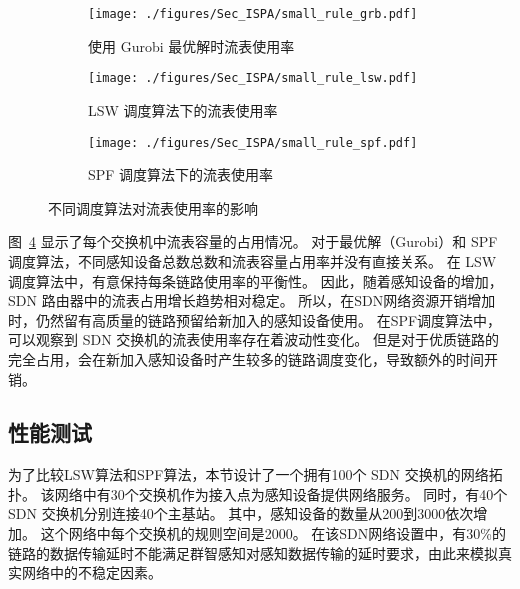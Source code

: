 
\begin{figure}[!h]
  \centering
  \begin{subfigure}[h]{0.99\linewidth}
  \centering

    \texttt{[image: ./figures/Sec\_ISPA/small\_rule\_grb.pdf]}
    \label{fig_smallNetworkRG}
    \caption{使用 Gurobi 最优解时流表使用率}
  \end{subfigure}
  \begin{subfigure}[h]{0.99\linewidth}
    \texttt{[image: ./figures/Sec\_ISPA/small\_rule\_lsw.pdf]}
    \label{fig_smallNetworkRL}
    \caption{LSW 调度算法下的流表使用率}
  \end{subfigure}
  \begin{subfigure}[h]{0.99\linewidth}
    \texttt{[image: ./figures/Sec\_ISPA/small\_rule\_spf.pdf]}
    \label{fig_smallNetworkRS}
    \caption{SPF 调度算法下的流表使用率}
  \end{subfigure}
  \vspace{-1em}
  \caption{不同调度算法对流表使用率的影响}
\label{fig_smallrule}
\end{figure}

图~\ref{fig_smallrule} 显示了每个交换机中流表容量的占用情况。
对于最优解（Gurobi）和 SPF 调度算法，不同感知设备总数总数和流表容量占用率并没有直接关系。
在 LSW 调度算法中，有意保持每条链路使用率的平衡性。
因此，随着感知设备的增加，SDN 路由器中的流表占用增长趋势相对稳定。
所以，在SDN网络资源开销增加时，仍然留有高质量的链路预留给新加入的感知设备使用。
在SPF调度算法中，可以观察到 SDN 交换机的流表使用率存在着波动性变化。
但是对于优质链路的完全占用，会在新加入感知设备时产生较多的链路调度变化，导致额外的时间开销。



\subsection{性能测试}

为了比较LSW算法和SPF算法，本节设计了一个拥有100个 SDN 交换机的网络拓扑。
该网络中有30个交换机作为接入点为感知设备提供网络服务。
同时，有40个 SDN 交换机分别连接40个主基站。
其中，感知设备的数量从200到3000依次增加。
这个网络中每个交换机的规则空间是2000。
在该SDN网络设置中，有30\%的链路的数据传输延时不能满足群智感知对感知数据传输的延时要求，由此来模拟真实网络中的不稳定因素。

